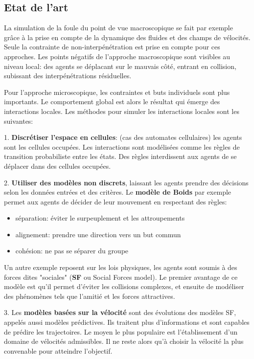 \documentclass[11pt]{article}
\begin{document}
\subsection{Etat de l'art}
 
La simulation de la foule du point de vue macroscopique se fait par exemple grâce à la prise en compte de la dynamique des fluides et des champs de vélocités. Seule la contrainte de non-interpénétration est prise en compte pour ces approches. Les points négatifs de l'approche macroscopique sont visibles au niveau local: des agents se déplacant sur le mauvais côté, entrant en collision, subissant des interpénétrations résiduelles.

Pour l'approche microscopique, les contraintes et buts individuels sont plus importants. Le comportement global est alors le résultat qui émerge des interactions locales. Les méthodes pour simuler les interactions locales sont les suivantes:

1. \textbf{Discrétiser l'espace en cellules}: (cas des automates cellulaires) les agents sont les cellules occupées. Les interactions sont modélisées comme les règles de transition probabiliste entre les états. Des règles interdissent aux agents de se déplacer dans des cellules occupées.

2. \textbf{Utiliser des modèles non discrets}, laissant les agents prendre des décisions selon les données entrées et des critères. Le \textbf{modèle de Boids} par exemple permet aux agents de décider de leur mouvement en respectant des règles:
\begin{itemize}
	\item séparation: éviter le surpeuplement et les attroupements
	\item alignement: prendre une direction vers un but commun
	\item cohésion: ne pas se séparer du groupe
\end{itemize}
Un autre exemple reposent sur les lois physiques, les agents sont soumis à des forces dites "sociales" (\textbf{SF} ou Social Forces model). Le premier avantage de ce modèle est qu'il permet d'éviter les collisions complexes, et ensuite de modéliser des phénomènes tels que l'amitié et les forces attractives.

3. Les \textbf{modèles basées sur la vélocité} sont des évolutions des modèles SF, appelés aussi modèles prédictives. Ils traitent plus d'informations et sont capables de prédire les trajectoires. Le moyen le plus populaire est l'établissement d'un domaine de vélocités admissibles. Il ne reste alors qu'à choisir la vélocité la plus convenable pour atteindre l'objectif.
\end{document}
